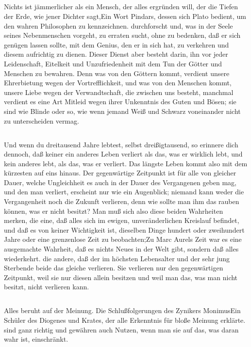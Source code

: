 \documentclass[12pt,ngerman,parskip=full]{scrartcl}
\newcounter{abschnitt}
\newcommand{\abschnitt}{\subsection*{\theabschnitt}\stepcounter{abschnitt}}
\begin{document}
\abschnitt

Nichts ist jämmerlicher als ein Mensch, der alles ergründen will, der die Tiefen der Erde, wie jener Dichter sagt,Ein Wort Pindars, dessen sich Plato bedient, um den wahren Philosophen zu kennzeichnen. durchforscht und, was in der Seele seines Nebenmenschen vorgeht, zu erraten sucht, ohne zu bedenken, daß er sich genügen lassen sollte, mit dem Genius, den er in sich hat, zu verkehren und diesem aufrichtig zu dienen. Dieser Dienst aber besteht darin, ihn vor jeder Leidenschaft, Eitelkeit und Unzufriedenheit mit dem Tun der Götter und Menschen zu bewahren. Denn was von den Göttern kommt, verdient unsere Ehrerbietung wegen der Vortrefflichkeit, und was von den Menschen kommt, unsere Liebe wegen der Verwandtschaft, die zwischen uns besteht, manchmal verdient es eine Art Mitleid wegen ihrer Unkenntnis des Guten und Bösen; sie sind wie Blinde oder so, wie wenn jemand Weiß und Schwarz voneinander nicht zu unterscheiden vermag.

\abschnitt

Und wenn du dreitausend Jahre lebtest, selbst dreißigtausend, so erinnere dich dennoch, daß keiner ein anderes Leben verliert als das, was er wirklich lebt, und kein anderes lebt, als das, was er verliert. Das längste Leben kommt also mit dem kürzesten auf eins hinaus. Der gegenwärtige Zeitpunkt ist für alle von gleicher Dauer, welche Ungleichheit es auch in der Dauer des Vergangenen geben mag, und den man verliert, erscheint nur wie ein Augenblick; niemand kann weder die Vergangenheit noch die Zukunft verlieren, denn wie sollte man ihm das rauben können, was er nicht besitzt? Man muß sich also diese beiden Wahrheiten merken, die eine, daß alles sich im ewigen, unveränderlichen Kreislauf befindet, und daß es von keiner Wichtigkeit ist, dieselben Dinge hundert oder zweihundert Jahre oder eine grenzenlose Zeit zu beobachten;Zu Marc Aurels Zeit war es eine ausgemachte Wahrheit, daß es nichts Neues in der Welt gibt, sondern daß alles wiederkehrt. die andere, daß der im höchsten Lebensalter und der sehr jung Sterbende beide das gleiche verlieren. Sie verlieren nur den gegenwärtigen Zeitpunkt, weil sie nur diesen allein besitzen und weil man das, was man nicht besitzt, nicht verlieren kann.

\abschnitt

Alles beruht auf der Meinung. Die Schlußfolgerungen des Zynikers MonimusEin Schüler des Diogenes und Krates, der alle Erkenntnis für bloße Meinung erklärte. sind ganz richtig und gewähren auch Nutzen, wenn man sie auf das, was daran wahr ist, einschränkt.
\end{document}
